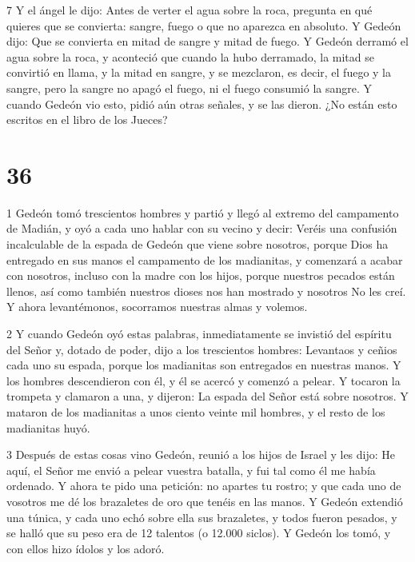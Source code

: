 \par 7 Y el ángel le dijo: Antes de verter el agua sobre la roca, pregunta en qué quieres que se convierta: sangre, fuego o que no aparezca en absoluto. Y Gedeón dijo: Que se convierta en mitad de sangre y mitad de fuego. Y Gedeón derramó el agua sobre la roca, y aconteció que cuando la hubo derramado, la mitad se convirtió en llama, y ​​la mitad en sangre, y se mezclaron, es decir, el fuego y la sangre, pero la sangre no apagó el fuego, ni el fuego consumió la sangre. Y cuando Gedeón vio esto, pidió aún otras señales, y se las dieron. ¿No están esto escritos en el libro de los Jueces?

\chapter{36}

\par 1 Gedeón tomó trescientos hombres y partió y llegó al extremo del campamento de Madián, y oyó a cada uno hablar con su vecino y decir: Veréis una confusión incalculable de la espada de Gedeón que viene sobre nosotros, porque Dios ha entregado en sus manos el campamento de los madianitas, y comenzará a acabar con nosotros, incluso con la madre con los hijos, porque nuestros pecados están llenos, así como también nuestros dioses nos han mostrado y nosotros No les creí. Y ahora levantémonos, socorramos nuestras almas y volemos.

\par 2 Y cuando Gedeón oyó estas palabras, inmediatamente se invistió del espíritu del Señor y, dotado de poder, dijo a los trescientos hombres: Levantaos y ceñios cada uno su espada, porque los madianitas son entregados en nuestras manos. Y los hombres descendieron con él, y él se acercó y comenzó a pelear. Y tocaron la trompeta y clamaron a una, y dijeron: La espada del Señor está sobre nosotros. Y mataron de los madianitas a unos ciento veinte mil hombres, y el resto de los madianitas huyó.

\par 3 Después de estas cosas vino Gedeón, reunió a los hijos de Israel y les dijo: He aquí, el Señor me envió a pelear vuestra batalla, y fui tal como él me había ordenado. Y ahora te pido una petición: no apartes tu rostro; y que cada uno de vosotros me dé los brazaletes de oro que tenéis en las manos. Y Gedeón extendió una túnica, y cada uno echó sobre ella sus brazaletes, y todos fueron pesados, y se halló que su peso era de 12 talentos (o 12.000 siclos). Y Gedeón los tomó, y con ellos hizo ídolos y los adoró.

